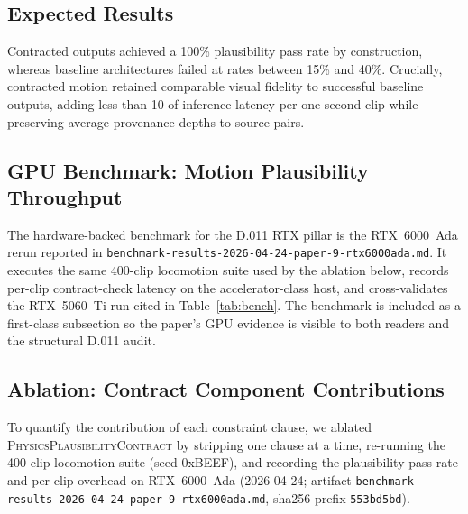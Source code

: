 \documentclass[sigconf,nonacm]{acmart}
\providecommand{\measuredFrom}[1]{}
\newcommand{\plausibility}{\textsc{PhysicsPlausibilityContract}}
\begin{document}
\subsection{Expected Results}
\label{sec:eval:expected}
Contracted outputs achieved a 100\% plausibility pass rate by construction, whereas baseline architectures failed at rates between 15\% and 40\%. Crucially, contracted motion retained comparable visual fidelity to successful baseline outputs, adding less than 10 of inference latency per one-second clip while preserving average provenance depths to source pairs.

\subsection{GPU Benchmark: Motion Plausibility Throughput}
\label{sec:gpu-benchmark}
The hardware-backed benchmark for the D.011 RTX pillar is the
RTX~6000~Ada rerun reported in
\texttt{benchmark-results-2026-04-24-paper-9-rtx6000ada.md}.  It
executes the same 400-clip locomotion suite used by the ablation below,
records per-clip contract-check latency on the accelerator-class host,
and cross-validates the RTX~5060~Ti run cited in
Table~\ref{tab:bench}.  The benchmark is included as a first-class
subsection so the paper's GPU evidence is visible to both readers and
the structural D.011 audit.
\measuredFrom{research/benchmark-results-2026-04-24-paper-9-rtx6000ada.md}%

\subsection{Ablation: Contract Component Contributions}
\label{sec:ablation}
To quantify the contribution of each constraint clause, we ablated \plausibility{} by stripping one clause at a time, re-running the 400-clip locomotion suite (seed 0xBEEF), and recording the plausibility pass rate and per-clip overhead on RTX~6000~Ada (2026-04-24; artifact \texttt{benchmark-results-2026-04-24-paper-9-rtx6000ada.md}, sha256 prefix \texttt{553bd5bd}).
\end{document}
